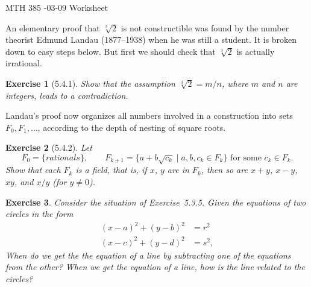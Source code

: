 \documentclass[12pt]{article}
\theoremstyle{plain}
\newtheorem{ex}{Exercise}
\begin{document}
MTH 385 -03-09 Worksheet

An elementary proof that $\sqrt[3]{2}$ is not constructible was found by the number theorist Edmund Landau (1877–1938) when he was still a student. It is broken down to easy steps below. But first we should check that $\sqrt[3]{2}$ is actually irrational.

\begin{ex}[5.4.1]
  Show that the assumption $\sqrt[3]{2}=m/n$, where $m$ and $n$ are integers, leads to a contradiction.
\end{ex}

Landau’s proof now organizes all numbers involved in a construction into sets $F_0,F_1,\ldots$, according to the depth of nesting of square roots.

\begin{ex}[5.4.2]
  Let
  \[
    F_0=\{rationals\},\qquad F_{k+1}=\{a+b\sqrt{c_k}\mid a,b,c_k\in F_k\}\text{ for some }c_k\in F_k.
  \]
  Show that each $F_k$ is a \emph{field}, that is, if $x$, $y$ are in $F_k$, then so are $x+y$, $x-y$, $xy$, and $x/y$ (for $y\neq0$).
\end{ex}

\begin{ex}
  Consider the situation of Exercise~5.3.5. Given the equations of two circles in the form
  \begin{align*}
    (x-a)^2+(y-b)^2 &= r^2 \\
    (x-c)^2+(y-d)^2 &= s^2,
  \end{align*}
  When do we get the the equation of a line by subtracting one of the equations from the other? When we get the equation of a line, how is the line related to the circles?
\end{ex}
\end{document}
